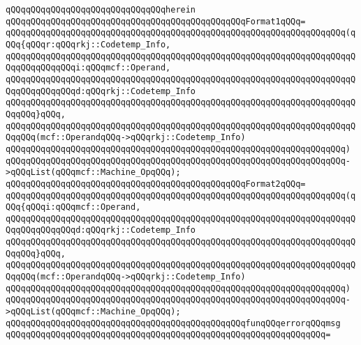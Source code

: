\verb|qQQqqQQqqQQqqQQqqQQqqQQqqQQqqQQqherein|\newline
\newline
\verb|qQQqqQQqqQQqqQQqqQQqqQQqqQQqqQQqqQQqqQQqqQQqqQQqFormat1qQQq=|\newline
\verb|qQQqqQQqqQQqqQQqqQQqqQQqqQQqqQQqqQQqqQQqqQQqqQQqqQQqqQQqqQQqqQQqqQQq(qQQq{qQQqr:qQQqrkj::Codetemp_Info,|\newline
\verb|qQQqqQQqqQQqqQQqqQQqqQQqqQQqqQQqqQQqqQQqqQQqqQQqqQQqqQQqqQQqqQQqqQQqqQQqqQQqqQQqqQQqi:qQQqmcf::Operand,|\newline
\verb|qQQqqQQqqQQqqQQqqQQqqQQqqQQqqQQqqQQqqQQqqQQqqQQqqQQqqQQqqQQqqQQqqQQqqQQqqQQqqQQqqQQqd:qQQqrkj::Codetemp_Info|\newline
\verb|qQQqqQQqqQQqqQQqqQQqqQQqqQQqqQQqqQQqqQQqqQQqqQQqqQQqqQQqqQQqqQQqqQQqqQQqqQQq}qQQq,|\newline
\verb|qQQqqQQqqQQqqQQqqQQqqQQqqQQqqQQqqQQqqQQqqQQqqQQqqQQqqQQqqQQqqQQqqQQqqQQqqQQq(mcf::OperandqQQq->qQQqrkj::Codetemp_Info)|\newline
\verb|qQQqqQQqqQQqqQQqqQQqqQQqqQQqqQQqqQQqqQQqqQQqqQQqqQQqqQQqqQQqqQQqqQQq)|\newline
\verb|qQQqqQQqqQQqqQQqqQQqqQQqqQQqqQQqqQQqqQQqqQQqqQQqqQQqqQQqqQQqqQQqqQQq->qQQqList(qQQqmcf::Machine_OpqQQq);|\newline
\newline
\verb|qQQqqQQqqQQqqQQqqQQqqQQqqQQqqQQqqQQqqQQqqQQqqQQqFormat2qQQq=|\newline
\verb|qQQqqQQqqQQqqQQqqQQqqQQqqQQqqQQqqQQqqQQqqQQqqQQqqQQqqQQqqQQqqQQqqQQq(qQQq{qQQqi:qQQqmcf::Operand,|\newline
\verb|qQQqqQQqqQQqqQQqqQQqqQQqqQQqqQQqqQQqqQQqqQQqqQQqqQQqqQQqqQQqqQQqqQQqqQQqqQQqqQQqqQQqd:qQQqrkj::Codetemp_Info|\newline
\verb|qQQqqQQqqQQqqQQqqQQqqQQqqQQqqQQqqQQqqQQqqQQqqQQqqQQqqQQqqQQqqQQqqQQqqQQqqQQq}qQQq,|\newline
\verb|qQQqqQQqqQQqqQQqqQQqqQQqqQQqqQQqqQQqqQQqqQQqqQQqqQQqqQQqqQQqqQQqqQQqqQQqqQQq(mcf::OperandqQQq->qQQqrkj::Codetemp_Info)|\newline
\verb|qQQqqQQqqQQqqQQqqQQqqQQqqQQqqQQqqQQqqQQqqQQqqQQqqQQqqQQqqQQqqQQqqQQq)|\newline
\verb|qQQqqQQqqQQqqQQqqQQqqQQqqQQqqQQqqQQqqQQqqQQqqQQqqQQqqQQqqQQqqQQqqQQq->qQQqList(qQQqmcf::Machine_OpqQQq);|\newline
\newline
\verb|qQQqqQQqqQQqqQQqqQQqqQQqqQQqqQQqqQQqqQQqqQQqqQQqfunqQQqerrorqQQqmsg|\newline
\verb|qQQqqQQqqQQqqQQqqQQqqQQqqQQqqQQqqQQqqQQqqQQqqQQqqQQqqQQqqQQqqQQq=|\newline
